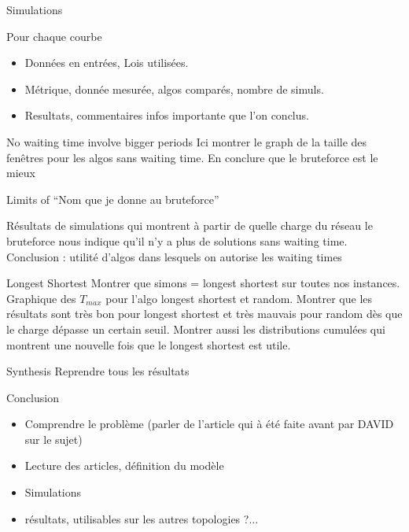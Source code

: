 \documentclass[a4paper,10pt]{report}
\begin{document}
\begin{chapter}{Simulations}


\begin{section}{Pour chaque courbe}
\begin{itemize}
 \item Données en entrées, Lois utilisées.
 \item Métrique, donnée mesurée, algos comparés, nombre de simuls.
 \item Resultats, commentaires infos importante que l'on conclus.
\end{itemize}
\end{section}

\begin{section}{No waiting time involve bigger periods}
Ici montrer le graph de la taille des fenêtres pour les algos sans waiting time.
 En conclure que le bruteforce est le mieux
\end{section}

\begin{section}{Limits of ``Nom que je donne au bruteforce''}

 Résultats de simulations qui montrent à partir de quelle charge du réseau le bruteforce nous indique qu'il n'y 
 a plus de solutions sans waiting time.
Conclusion : utilité d'algos dans lesquels on autorise les waiting times
\end{section}

\begin{section}{Longest Shortest}
Montrer que simons = longest shortest sur toutes nos instances.
Graphique des $T_{max}$ pour l'algo longest shortest et random.
Montrer que les résultats sont très bon pour longest shortest et très mauvais pour random dès que le charge dépasse un certain seuil.
Montrer aussi les distributions cumulées qui montrent une nouvelle fois que le longest shortest est utile.
\end{section}

\begin{section}{Synthesis}
Reprendre tous les résultats
\end{section}

\end{chapter}



\begin{chapter}{Conclusion}
\begin{itemize}
 \item Comprendre le problème (parler de l'article qui à été faite avant par DAVID sur le sujet)
 \item Lecture des articles, définition du modèle
 \item Simulations
 \item résultats, utilisables sur les autres topologies ?...
\end{itemize}



\end{chapter}




\end{document}
